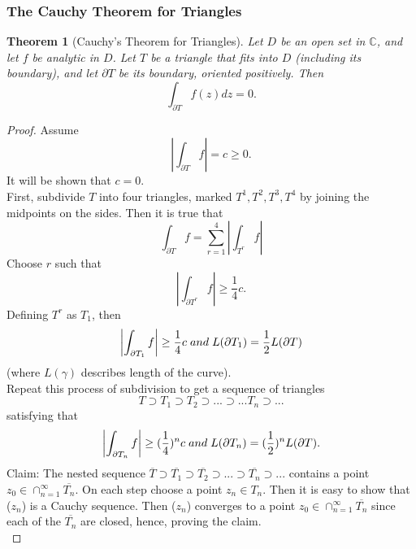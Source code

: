 \documentclass{article}
\newtheorem{theorem}{Theorem}[section]
\begin{document}
\subsubsection{The Cauchy Theorem for Triangles}
\begin{theorem}[Cauchy's Theorem for Triangles]
Let $D$ be an open set in $\mathbb{C}$, and let $f$ be analytic in $D$. Let $T$ be a triangle that fits into $D$ (including its boundary), and let $\partial T$ be its boundary, oriented positively. Then
\begin{equation*}
\int_{\partial T} f(z)dz = 0.
\end{equation*}
\end{theorem}
\begin{proof}
Assume
\begin{equation*}
\left|\int_{\partial T} f\right| = c \geq 0.
\end{equation*}
It will be shown that $c = 0$. \\
First, subdivide $T$ into four triangles, marked $T^1, T^2, T^3, T^4$ by joining the midpoints on the sides. Then it is true that
\begin{equation*}
\int_{\partial T} f = \sum_{r=1}^4 \left|\int_{T^r}f\right|
\end{equation*}
Choose $r$ such that
\begin{equation*}
\left| \int_{\partial T^r} f \right| \geq \frac{1}{4}c.
\end{equation*}
Defining $T^r$ as $T_1$, then
\begin{equation*}
\left| \int_{\partial T_1} f\right| \geq \frac{1}{4}c \hspace{0.1cm} and \hspace{0.1cm} L (\partial T_1) = \frac{1}{2} L(\partial T)
\end{equation*}
(where $L(\gamma)$ describes length of the curve). \\
Repeat this process of subdivision to get a sequence of triangles
\begin{equation*}
T \supset T_1 \supset T_2 \supset ... \supset ... T_n \supset ...
\end{equation*}
satisfying that 
\begin{equation*}
\left| \int_{\partial T_n} f\right| \geq (\frac{1}{4})^n c \hspace{0.1cm} and \hspace{0.1cm} L(\partial T_n) = (\frac{1}{2})^n L(\partial T).
\end{equation*}
Claim: The nested sequence $\overline{T} \supset \overline{T_1} \supset \overline{T_2} \supset ... \supset \overline{T_n} \supset ...$ contains a point $z_0 \in \cap_{n=1}^{\infty} \overline{T_n}$. On each step choose a point $z_n \in T_n$. Then it is easy to show that ($z_n$) is a Cauchy sequence. Then ($z_n$) converges to a point $z_0 \in \cap_{n=1}^{\infty} \overline{T_n}$ since each of the $\overline{T_n}$ are closed, hence, proving the claim. \\

\end{proof}
\end{document}

